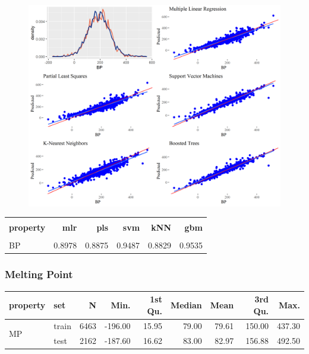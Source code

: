 \documentclass[10pt, letter]{article}
\renewcommand{\=}{\, =\, }
\newcommand{\+}{\, +\, }
\renewcommand{\-}{\, -\, }
\begin{document}
\begin{figure}[H]
  \centering
    \includegraphics[width=1.0\textwidth]{BP_plots.png}
\end{figure}

\begin{table}[H]
\begin{center}
\begin{tabular}{lrrrrr}
\toprule
&&\\
{\bf property} & {\bf mlr} & {\bf pls} &  {\bf svm}  & {\bf kNN}  & {\bf gbm}\\
\midrule
&&\\
BP  &   0.8978 & 0.8875 & 0.9487 & 0.8829 & 0.9535\\
\midrule
\hline
\end{tabular}
\end{center}
\end{table}

\subsubsection{Melting Point}

\begin{table}[H]
\begin{center}
\begin{tabular}{llrrrrrrr}
\toprule
{\bf property} & {\bf set} & {\bf N} & {\bf Min.} & {\bf 1st Qu.} &  {\bf Median}  & {\bf Mean}  & {\bf 3rd Qu.} & {\bf Max.}\\
\midrule
\multirow{2}{15mm}{MP}
& train &  6463 & -196.00 & 15.95 & 79.00 & 79.61 & 150.00 & 437.30\\
& test &  2162 & -187.60 & 16.62 & 83.00 & 82.97 & 156.88 & 492.50\\
\midrule
\hline
\end{tabular}
\end{center}
\end{table}
\end{document}
